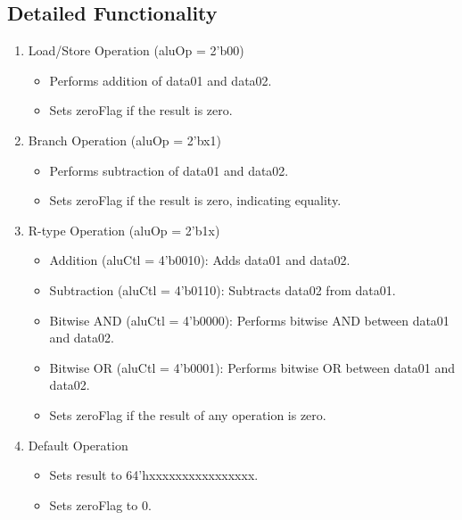 \subsection{Detailed Functionality}
\begin{enumerate}
    \item Load/Store Operation (aluOp = 2'b00)
     \begin{itemize}
    \item Performs addition of data01 and data02.
     \item Sets zeroFlag if the result is zero.
     \end{itemize}
    
    \item Branch Operation (aluOp = 2'bx1)
    \begin{itemize}
     \item Performs subtraction of data01 and data02.
     \item Sets zeroFlag if the result is zero, indicating equality.
     \end{itemize}
     
    \item R-type Operation (aluOp = 2'b1x)
           \begin{itemize}
     \item Addition (aluCtl = 4'b0010): Adds data01 and data02.
    \item Subtraction (aluCtl = 4'b0110): Subtracts data02 from data01.
    \item Bitwise AND (aluCtl = 4'b0000): Performs bitwise AND between data01 and data02.
     \item Bitwise OR (aluCtl = 4'b0001): Performs bitwise OR between data01 and data02.
     \item Sets zeroFlag if the result of any operation is zero.
     \end{itemize}
    
    \item Default Operation
      \begin{itemize}
     \item Sets result to 64'hxxxxxxxxxxxxxxxx.
     \item Sets zeroFlag to 0.
     \end{itemize}
\end{enumerate}
